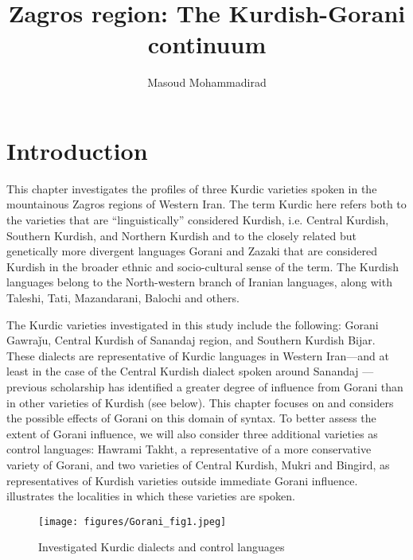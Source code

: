 \documentclass[output=paper,colorlinks,citecolor=brown]{langscibook}
\author{Masoud Mohammadirad\orcid{0000-0002-8531-5524}\affiliation{University of Cambridge}}
\title{Zagros region: The Kurdish-Gorani continuum}
\begin{document}
\begin{sloppypar}
    
\maketitle\label{WOWA:ch:9}

\section{Introduction}
This chapter investigates the  profiles of three Kurdic varieties spoken in the mountainous Zagros regions of Western Iran. The term Kurdic here refers both to the varieties that are “linguistically” considered Kurdish, i.e. Central Kurdish, Southern Kurdish, and Northern Kurdish and to the closely related but genetically more divergent languages Gorani and Zazaki that are considered Kurdish in the broader ethnic and socio-cultural sense of the term. The Kurdish languages belong to the North-western branch of Iranian languages, along with Taleshi, Tati, Mazandarani, Balochi and others. 

The Kurdic varieties investigated in this study include the following: Gorani Gawraǰu, Central Kurdish of Sanandaj region, and Southern Kurdish Bijar. These dialects are representative of Kurdic languages in Western Iran—and at least in the case of the Central Kurdish dialect spoken around Sanandaj — previous scholarship has identified a greater degree of influence from Gorani than in other varieties of Kurdish (see below). This chapter focuses on  and considers the possible effects of Gorani on this domain of syntax. To better assess the extent of Gorani influence, we will also consider three additional varieties as control languages: Hawrami Takht, a representative of a more conservative variety of Gorani, and two varieties of Central Kurdish, Mukri and Bingird, as representatives of Kurdish varieties outside immediate Gorani influence.  illustrates the localities in which these varieties are spoken.

\largerpage

\begin{figure}
    \texttt{[image: figures/Gorani\_fig1.jpeg]}
    \caption{Investigated Kurdic dialects and control languages}
    \label{Kurdish:fig:1}
\end{figure}


\end{sloppypar}
\end{document}
